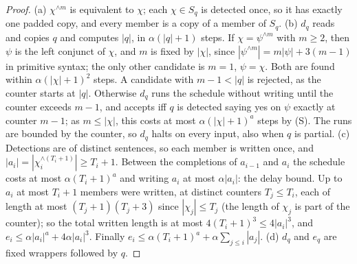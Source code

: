 \begin{proof}
(a) $\chi^{\wedge m}$ is equivalent to $\chi$; each $\chi\in S_q$ is detected once, so it has exactly one padded copy, and every member is a copy of a member of $S_q$.
(b) $d_q$ reads and copies $q$ and computes $|q|$, in $\alpha(|q|+1)$ steps. If $\chi=\psi^{\wedge m}$ with $m\ge2$, then $\psi$ is the left conjunct of $\chi$, and $m$ is fixed by $|\chi|$, since $|\psi^{\wedge m}|=m|\psi|+3(m-1)$ in primitive syntax; the only other candidate is $m=1$, $\psi=\chi$. Both are found within $\alpha(|\chi|+1)^2$ steps. A candidate with $m-1<|q|$ is rejected, as the counter starts at $|q|$. Otherwise $d_q$ runs the schedule without writing until the counter exceeds $m-1$, and accepts iff $q$ is detected saying yes on $\psi$ exactly at counter $m-1$; as $m\le|\chi|$, this costs at most $\alpha(|\chi|+1)^a$ steps by (S). The runs are bounded by the counter, so $d_q$ halts on every input, also when $q$ is partial.
(c) Detections are of distinct sentences, so each member is written once, and $|a_i|=|\chi_i^{\wedge(T_i+1)}|\ge T_i+1$. Between the completions of $a_{i-1}$ and $a_i$ the schedule costs at most $\alpha(T_i+1)^a$ and writing $a_i$ at most $\alpha|a_i|$: the delay bound. Up to $a_i$ at most $T_i+1$ members were written, at distinct counters $T_j\le T_i$, each of length at most $(T_j+1)(T_j+3)$ since $|\chi_j|\le T_j$ (the length of $\chi_j$ is part of the counter); so the total written length is at most $4(T_i+1)^3\le4|a_i|^3$, and $e_i\le\alpha|a_i|^a+4\alpha|a_i|^3$. Finally $e_i\le\alpha(T_i+1)^a+\alpha\sum_{j\le i}|a_j|$.
(d) $d_q$ and $e_q$ are fixed wrappers followed by $q$.
\end{proof}

